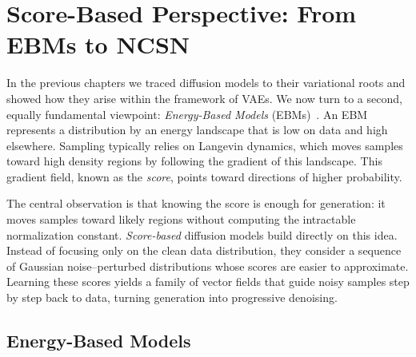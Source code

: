 \chapter{Score-Based Perspective: From EBMs to NCSN}\label{ch:score-based}


In the previous chapters we traced diffusion models to their variational roots and showed how they arise within the framework of VAEs. We now turn to a second, equally fundamental viewpoint: \emph{Energy-Based Models} (EBMs)~\citep{ackley1985learning,lecun2006tutorial}. An EBM represents a distribution by an energy landscape that is low on data and high elsewhere. Sampling typically relies on Langevin dynamics, which moves samples toward high density regions by following the gradient of this landscape. This gradient field, known as the \emph{score}, points toward directions of higher probability.

The central observation is that knowing the score is enough for generation: it moves samples toward likely regions without computing the intractable normalization constant. \emph{Score-based} diffusion models build directly on this idea. Instead of focusing only on the clean data distribution, they consider a sequence of Gaussian noise–perturbed distributions whose scores are easier to approximate. Learning these scores yields a family of vector fields that guide noisy samples step by step back to data, turning generation into progressive denoising.





\newpage


\section{Energy-Based Models}\label{sec:ebm}


